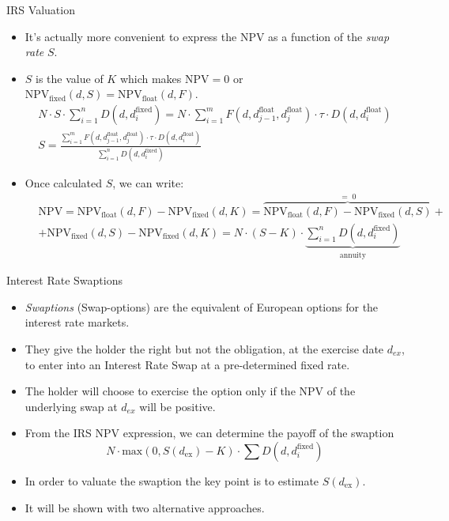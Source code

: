 \documentclass{beamer}
\begin{document}
\begin{frame}{IRS Valuation}
	\begin{itemize}	
	\item It's actually more convenient to express the NPV as a function of the \emph{swap rate} $S$.
	\item $S$ is the value of $K$ which makes $\mathrm{NPV}=0$ or 		$\mathrm{NPV}_{\mathrm{fixed}}(d, S) = \mathrm{NPV}_{\mathrm{float}}(d, F)$.
	\begin{equation*}
		\begin{gathered}
		N\cdot S\cdot\sum_{i=1}^{n}D(d, d_{i}^{\mathrm{fixed}}) = N\cdot\sum_{i=1}^{m}F(d, d_{j-1}^{\mathrm{float}}, d_{j}^{\mathrm{float}}) \cdot\tau\cdot D(d, d_{i}^{\mathrm{float}})\\
		S=\frac{\sum_{i=1}^{m}F(d, d_{j-1}^{\mathrm{float}}, d_{j}^{\mathrm{float}}) \cdot \tau\cdot D(d, d_{i}^{\mathrm{float}})}{\sum_{i=1}^{n}D(d, d_i^{\mathrm{fixed}})}
		\end{gathered}
	\end{equation*}
	\item Once calculated $S$, we can write:
	\begin{align*}
	&\mathrm{NPV} = \mathrm{NPV}_{\mathrm{float}}(d, F) - \mathrm{NPV}_{\mathrm{fixed}}(d, K) = \overbrace{\mathrm{NPV}_{\mathrm{float}}(d, F) - \mathrm{NPV}_{\mathrm{fixed}}(d, S)}^{\mathrm{=\;0}} + \\& + \mathrm{NPV}_{\mathrm{fixed}}(d, S) - \mathrm{NPV}_{\mathrm{fixed}}(d, K) = N\cdot(S-K)\cdot\underbrace{\sum_{i=1}^{n}D(d, d_{i}^{\mathrm{fixed}})}_{\mathrm{annuity}}
	\end{align*}
	\end{itemize}
\href{https://colab.research.google.com/drive/1UCd7-7utNIBU7H6TPfyd0hpuAK1ihdOH?authuser=1#scrollTo=caca0865}{}
\end{frame}

\begin{frame}{Interest Rate Swaptions}
	\begin{itemize}
		\item \emph{Swaptions} (Swap-options) are the equivalent of European options for the interest rate markets.
		\item They give the holder the right but not the obligation, at the exercise date $d_{ex}$, to enter into an Interest Rate Swap at a pre-determined fixed rate.
		\item The holder will choose to exercise the option only if the NPV of the underlying swap at $d_{ex}$ will be positive.
		\item From the IRS NPV expression, we can determine the payoff of the swaption 
		\begin{equation*}
		N\cdot \mathrm{max}(0, S(d_{\mathrm{ex}}) - K)\cdot\sum D(d, d_i^{\mathrm{fixed}})
		\end{equation*}
		\item In order to valuate the swaption the key point is to estimate $S(d_{\mathrm{ex}})$. 
		\item It will be shown with two alternative approaches.
	\end{itemize}
\end{frame}
\end{document}
